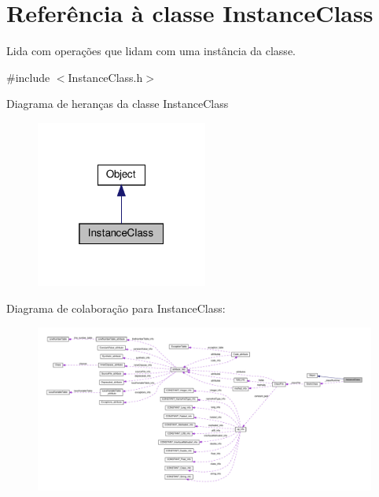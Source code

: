 \hypertarget{classInstanceClass}{}\section{Referência à classe Instance\+Class}
\label{classInstanceClass}


Lida com operações que lidam com uma instância da classe.  




{\ttfamily \#include $<$Instance\+Class.\+h$>$}



Diagrama de heranças da classe Instance\+Class
\nopagebreak
\begin{figure}[H]
\begin{center}
\leavevmode
\includegraphics[width=160pt]{classInstanceClass__inherit__graph}
\end{center}
\end{figure}


Diagrama de colaboração para Instance\+Class\+:
\nopagebreak
\begin{figure}[H]
\begin{center}
\leavevmode
\includegraphics[width=350pt]{classInstanceClass__coll__graph}
\end{center}
\end{figure}
